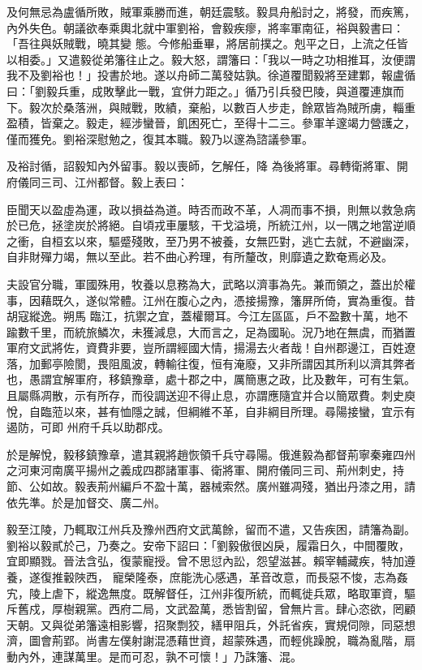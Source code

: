 \begin{pinyinscope}
 及何無忌為盧循所敗，賊軍乘勝而進，朝廷震駭。毅具舟船討之，將發，而疾篤，內外失色。朝議欲奉乘輿北就中軍劉裕，會毅疾瘳，將率軍南征，裕與毅書曰：「吾往與妖賊戰，曉其變
 態。今修船垂畢，將居前撲之。剋平之日，上流之任皆以相委。」又遣毅從弟籓往止之。毅大怒，謂籓曰：「我以一時之功相推耳，汝便謂我不及劉裕也！」投書於地。遂以舟師二萬發姑孰。徐道覆聞毅將至建鄴，報盧循曰：「劉毅兵重，成敗擊此一戰，宜併力距之。」循乃引兵發巴陵，與道覆連旗而下。毅次於桑落洲，與賊戰，敗績，棄船，以數百人步走，餘眾皆為賊所虜，輜重盈積，皆棄之。毅走，經涉蠻晉，飢困死亡，至得十二三。參軍羊邃竭力營護之，僅而獲免。劉裕深慰勉之，復其本職。毅乃以邃為諮議參軍。



 及裕討循，詔毅知內外留事。毅以喪師，乞解任，降
 為後將軍。尋轉衛將軍、開府儀同三司、江州都督。毅上表曰：



 臣聞天以盈虛為運，政以損益為道。時否而政不革，人凋而事不損，則無以救急病於已危，拯塗炭於將絕。自頃戎車屢駭，干戈溢境，所統江州，以一隅之地當逆順之衝，自桓玄以來，驅蹙殘敗，至乃男不被養，女無匹對，逃亡去就，不避幽深，自非財殫力竭，無以至此。若不曲心矜理，有所釐改，則靡遺之歎奄焉必及。



 夫設官分職，軍國殊用，牧養以息務為大，武略以濟事為先。兼而領之，蓋出於權事，因藉既久，遂似常體。江州在腹心之內，憑接揚豫，籓屏所倚，實為重復。昔胡寇縱逸。朔馬
 臨江，抗禦之宜，蓋權爾耳。今江左區區，戶不盈數十萬，地不踰數千里，而統旅鱗次，未獲減息，大而言之，足為國恥。況乃地在無虞，而猶置軍府文武將佐，資費非要，豈所謂經國大情，揚湯去火者哉！自州郡邊江，百姓遼落，加郵亭險閡，畏阻風波，轉輸往復，恒有淹廢，又非所謂因其所利以濟其弊者也，愚謂宜解軍府，移鎮豫章，處十郡之中，厲簡惠之政，比及數年，可有生氣。且屬縣凋散，示有所存，而役調送迎不得止息，亦謂應隨宜并合以簡眾費。刺史庾悅，自臨蒞以來，甚有恤隱之誠，但綱維不革，自非綱目所理。尋陽接蠻，宜示有遏防，可即
 州府千兵以助郡戍。



 於是解悅，毅移鎮豫章，遣其親將趙恢領千兵守尋陽。俄進毅為都督荊寧秦雍四州之河東河南廣平揚州之義成四郡諸軍事、衛將軍、開府儀同三司、荊州刺史，持節、公如故。毅表荊州編戶不盈十萬，器械索然。廣州雖凋殘，猶出丹漆之用，請依先準。於是加督交、廣二州。



 毅至江陵，乃輒取江州兵及豫州西府文武萬餘，留而不遣，又告疾困，請籓為副。劉裕以毅貳於己，乃奏之。安帝下詔曰：「劉毅傲很凶戾，履霜日久，中間覆敗，宜即顯戮。晉法含弘，復蒙寵授。曾不思愆內訟，怨望滋甚。賴宰輔藏疾，特加遵養，遂復推轂陜西，
 寵榮隆泰，庶能洗心感遇，革音改意，而長惡不悛，志為姦宄，陵上虐下，縱逸無度。既解督任，江州非復所統，而輒徙兵眾，略取軍資，驅斥舊戍，厚樹親黨。西府二局，文武盈萬，悉皆割留，曾無片言。肆心恣欲，罔顧天朝。又與從弟籓遠相影響，招聚剽狡，繕甲阻兵，外託省疾，實規伺隙，同惡想濟，圖會荊郢。尚書左僕射謝混憑藉世資，超蒙殊遇，而輕佻躁脫，職為亂階，扇動內外，連謀萬里。是而可忍，孰不可懷！」乃誅籓、混。




\end{pinyinscope}
